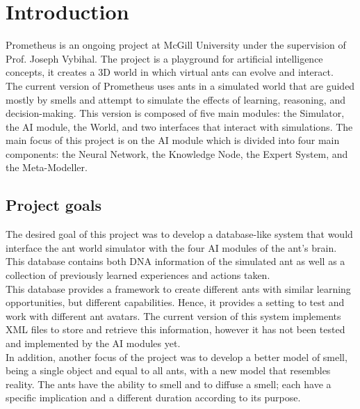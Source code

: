 \documentclass[titlepage, 12pt]{article}
\begin{document}
\newpage
\tableofcontents
\newpage
\clearpage
{}


\section{Introduction} 

Prometheus is an ongoing project at McGill University under the supervision of Prof. Joseph Vybihal. The project is a playground for artificial intelligence concepts, it creates a 3D world in which virtual ants can evolve and interact. \\

The current version of Prometheus uses ants in a simulated world that are guided mostly by smells and attempt to simulate the effects of learning, reasoning, and decision-making. This version is composed of five main modules: the Simulator, the AI module, the World, and two interfaces that interact with simulations. The main focus of this project is on the AI module which is divided into four main components: the Neural Network, the Knowledge Node, the Expert System, and the Meta-Modeller. \\

\subsection{Project goals}

The desired goal of this project was to develop a database-like system that would interface the ant world simulator with the four AI modules of the ant's brain. This database contains both DNA information of the simulated ant as well as a collection of previously learned experiences and actions taken. \\

This database provides a framework to create different ants with similar learning opportunities, but different capabilities. Hence, it provides a setting to test and work with different ant avatars. The current version of this system implements XML files to store and retrieve this information, however it has not been tested and implemented by the AI modules yet. \\

In addition, another focus of the project was to develop a better model of smell, being a single object and equal to all ants, with a new model that resembles reality. The ants have the ability to smell and to diffuse a smell; each have a specific implication and a different duration according to its purpose.  
\end{document}
